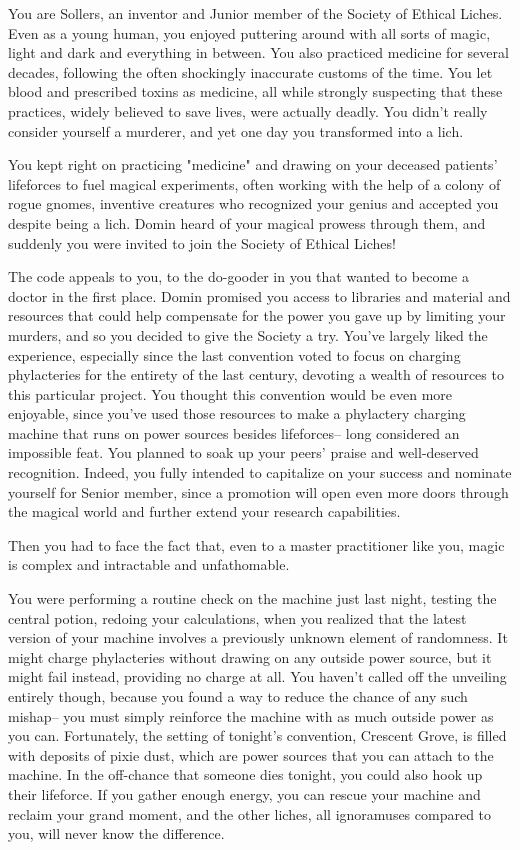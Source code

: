 \documentclass[char]{Sel}
\begin{document}
\name{\cSollers{}}
You are Sollers, an inventor and Junior member of the Society of Ethical Liches. Even as a young human, you enjoyed puttering around with all sorts of magic, light and dark and everything in between. You also practiced medicine for several decades, following the often shockingly inaccurate customs of the time. You let blood and prescribed toxins as medicine, all while strongly suspecting that these practices, widely believed to save lives, were actually deadly. You didn't really consider yourself a murderer, and yet one day you transformed into a lich.

You kept right on practicing "medicine" and drawing on your deceased patients' lifeforces to fuel magical experiments, often working with the help of a colony of rogue gnomes, inventive creatures who recognized your genius and accepted you despite being a lich. Domin heard of your magical prowess through them, and suddenly you were invited to join the Society of Ethical Liches!

The code appeals to you, to the do-gooder in you that wanted to become a doctor in the first place. Domin promised you access to libraries and material and resources that could help compensate for the power you gave up by limiting your murders, and so you decided to give the Society a try. You've largely liked the experience, especially since the last convention voted to focus on charging phylacteries for the entirety of the last century, devoting a wealth of resources to this particular project. You thought this convention would be even more enjoyable, since you've used those resources to make a phylactery charging machine that runs on power sources besides lifeforces-- long considered an impossible feat. You planned to soak up your peers' praise and well-deserved recognition. Indeed, you fully intended to capitalize on your success and nominate yourself for Senior member, since a promotion will open even more doors through the magical world and further extend your research capabilities.

Then you had to face the fact that, even to a master practitioner like you, magic is complex and intractable and unfathomable.

You were performing a routine check on the machine just last night, testing the central potion, redoing your calculations, when you realized that the latest version of your machine involves a previously unknown element of randomness. It might charge phylacteries without drawing on any outside power source, but it might fail instead, providing no charge at all. You haven't called off the unveiling entirely though, because you found a way to reduce the chance of any such mishap-- you must simply reinforce the machine with as much outside power as you can. Fortunately, the setting of tonight's convention, Crescent Grove, is filled with deposits of pixie dust, which are power sources that you can attach to the machine. In the off-chance that someone dies tonight, you could also hook up their lifeforce. If you gather enough energy, you can rescue your machine and reclaim your grand moment, and the other liches, all ignoramuses compared to you, will never know the difference.
\end{document}
